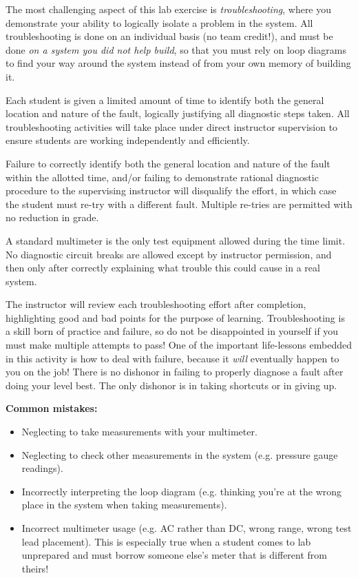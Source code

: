 \vskip 5pt

The most challenging aspect of this lab exercise is {\it troubleshooting}, where you demonstrate your ability to logically isolate a problem in the system.  All troubleshooting is done on an individual basis (no team credit!), and must be done {\it on a system you did not help build}, so that you must rely on loop diagrams to find your way around the system instead of from your own memory of building it.

Each student is given a limited amount of time to identify both the general location and nature of the fault, logically justifying all diagnostic steps taken.  All troubleshooting activities will take place under direct instructor supervision to ensure students are working independently and efficiently. 

Failure to correctly identify both the general location and nature of the fault within the allotted time, and/or failing to demonstrate rational diagnostic procedure to the supervising instructor will disqualify the effort, in which case the student must re-try with a different fault.  Multiple re-tries are permitted with no reduction in grade.

A standard multimeter is the only test equipment allowed during the time limit.  No diagnostic circuit breaks are allowed except by instructor permission, and then only after correctly explaining what trouble this could cause in a real system.  

The instructor will review each troubleshooting effort after completion, highlighting good and bad points for the purpose of learning.  Troubleshooting is a skill born of practice and failure, so do not be disappointed in yourself if you must make multiple attempts to pass!  One of the important life-lessons embedded in this activity is how to deal with failure, because it {\it will} eventually happen to you on the job!  There is no dishonor in failing to properly diagnose a fault after doing your level best.  The only dishonor is in taking shortcuts or in giving up.

\vskip 10pt

{\bf Common mistakes:}

\begin{itemize}
\item{} Neglecting to take measurements with your multimeter.
\item{} Neglecting to check other measurements in the system (e.g. pressure gauge readings).
\item{} Incorrectly interpreting the loop diagram (e.g. thinking you're at the wrong place in the system when taking measurements).
\item{} Incorrect multimeter usage (e.g. AC rather than DC, wrong range, wrong test lead placement).  This is especially true when a student comes to lab unprepared and must borrow someone else's meter that is different from theirs!
\end{itemize}

